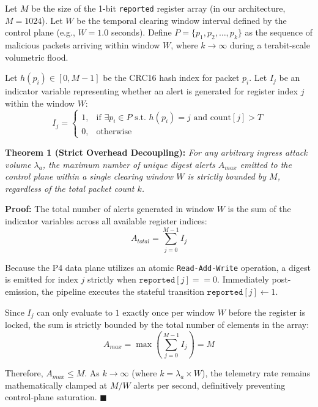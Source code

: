 \documentclass[sigconf, nonacm]{acmart}
\begin{document}
Let $M$ be the size of the 1-bit \texttt{reported} register array (in our architecture, $M = 1024$). Let $W$ be the temporal clearing window interval defined by the control plane (e.g., $W = 1.0$ seconds). Define $P = \{p_1, p_2, \dots, p_k\}$ as the sequence of malicious packets arriving within window $W$, where $k \to \infty$ during a terabit-scale volumetric flood.

Let $h(p_i) \in [0, M-1]$ be the CRC16 hash index for packet $p_i$. Let $I_j$ be an indicator variable representing whether an alert is generated for register index $j$ within the window $W$:
\begin{equation}
I_j = 
\begin{cases} 
1, & \text{if } \exists p_i \in P \text{ s.t. } h(p_i) = j \text{ and count}[j] > T \\
0, & \text{otherwise}
\end{cases}
\end{equation}

\textbf{Theorem 1 (Strict Overhead Decoupling):} \textit{For any arbitrary ingress attack volume $\lambda_a$, the maximum number of unique digest alerts $A_{max}$ emitted to the control plane within a single clearing window $W$ is strictly bounded by $M$, regardless of the total packet count $k$.}

\textbf{Proof:} The total number of alerts generated in window $W$ is the sum of the indicator variables across all available register indices:
\begin{equation}
A_{total} = \sum_{j=0}^{M-1} I_j
\end{equation}

Because the P4 data plane utilizes an atomic \texttt{Read-Add-Write} operation, a digest is emitted for index $j$ strictly when $\texttt{reported}[j] == 0$. Immediately post-emission, the pipeline executes the stateful transition $\texttt{reported}[j] \leftarrow 1$. 

Since $I_j$ can only evaluate to $1$ exactly once per window $W$ before the register is locked, the sum is strictly bounded by the total number of elements in the array:
\begin{equation}
A_{max} = \max \left( \sum_{j=0}^{M-1} I_j \right) = M
\end{equation}

Therefore, $A_{max} \le M$. As $k \to \infty$ (where $k = \lambda_a \times W$), the telemetry rate remains mathematically clamped at $M / W$ alerts per second, definitively preventing control-plane saturation. $\blacksquare$
\end{document}

